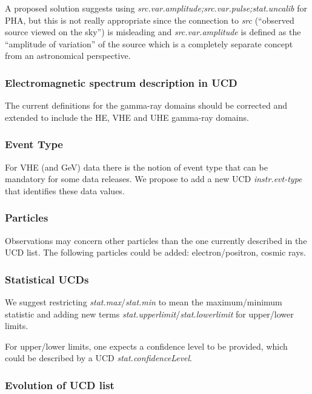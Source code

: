 \documentclass[11pt,a4paper]{ivoa}
\begin{document}
A proposed solution suggests using {\em src.var.amplitude;src.var.pulse;stat.uncalib\/} for PHA, but this is not really appropriate since the connection to {\em src\/} (``observed source viewed on the sky'') is misleading and {\em src.var.amplitude\/} is defined as the ``amplitude of variation'' of the source which is a completely separate concept from an astronomical perspective.

\subsubsection{Electromagnetic spectrum description in UCD}

The current definitions for the gamma-ray domains should be corrected and extended to include the \gls{HE}, \gls{VHE} and \gls{UHE} gamma-ray domains.

\subsubsection{Event Type}

For \gls{VHE} (and GeV) data there is the notion of event type that can be mandatory for some data releases.  We propose to add a new UCD {\em instr.evt-type\/} that identifies these data values.

\subsubsection{Particles}

Observations may concern other particles than the one currently described in the UCD list. The following particles could be added: electron/positron, cosmic rays.

\subsubsection{Statistical UCDs}

We suggest restricting {\em stat.max}/{\em stat.min} to mean the maximum/minimum statistic and adding new terms {\em stat.upperlimit}/{\em stat.lowerlimit} for upper/lower limits.

For upper/lower limits, one expects a confidence level to be provided, which could be described by a UCD {\em stat.confidenceLevel}.

\subsubsection{Evolution of UCD list}
\end{document}
